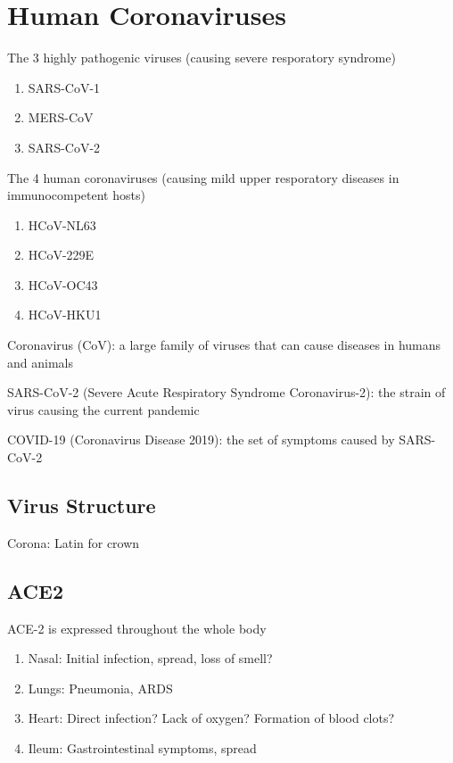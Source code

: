 \documentclass{notes}
\begin{document}
\section{Human Coronaviruses}

The 3 highly pathogenic viruses (causing severe resporatory syndrome)

\begin{enumerate}
    \item SARS-CoV-1
    \item MERS-CoV
    \item SARS-CoV-2
\end{enumerate}

The 4 human coronaviruses (causing mild upper resporatory diseases in immunocompetent hosts)

\begin{enumerate}
    \item HCoV-NL63
    \item HCoV-229E
    \item HCoV-OC43
    \item HCoV-HKU1
\end{enumerate}

Coronavirus (CoV): a large family of viruses that can cause diseases in humans and animals

SARS-CoV-2 (Severe Acute Respiratory Syndrome Coronavirus-2): the strain of virus causing the current pandemic

COVID-19 (Coronavirus Disease 2019): the set of symptoms caused by SARS-CoV-2

\subsection{Virus Structure}

Corona: Latin for crown



\subsection{ACE2}
ACE-2 is expressed throughout the whole body

\begin{enumerate}
    \item Nasal: Initial infection, spread, loss of smell?
    \item Lungs: Pneumonia, ARDS
    \item Heart: Direct infection? Lack of oxygen? Formation of blood clots?
    \item Ileum: Gastrointestinal symptoms, spread
\end{enumerate}
\end{document}
